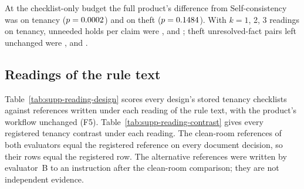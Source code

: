 At the checklist-only budget the full product's difference from Self-consistency was \sthreeFFourTenBudgetChecklistFullProductDiff{} on tenancy ($p=0.0002$) and \sthreeFFourThBudgetChecklistFullProductDiff{} on theft ($p=0.1484$). With $k=1$, 2, 3 readings on tenancy, unneeded holds per claim were \sthreeFFourTenKOneSpurHold, \sthreeFFourTenKTwoSpurHold{} and \sthreeFFourTenKThreeSpurHold; theft unresolved-fact pairs left unchanged were \sthreeFFourThKOneUnchanged, \sthreeFFourThKTwoUnchanged{} and \sthreeFFourThKThreeUnchanged.

\subsection{Readings of the rule text}
\label{supp:readings}

Table~\ref{tab:supp-reading-design} scores every design's stored tenancy checklists against references written under each reading of the rule text, with the product's workflow unchanged (F5). Table~\ref{tab:supp-reading-contrast} gives every registered tenancy contrast under each reading. The clean-room references of both evaluators equal the registered reference on every document decision, so their rows equal the registered row. The alternative references were written by evaluator~B to an instruction after the clean-room comparison; they are not independent evidence.

